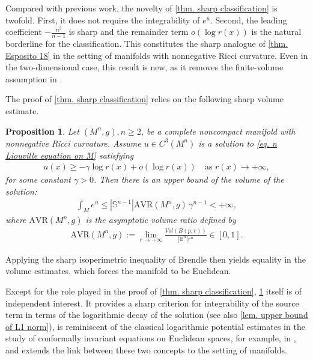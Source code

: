 \documentclass[12pt]{amsart}
\theoremstyle{plain}
\newtheorem{proposition}[theorem]{Proposition}
\theoremstyle{definition}
\theoremstyle{remark}     %
\begin{document}
Compared with previous work, the novelty of \cref{thm. sharp classification} is twofold. First, it does not require the integrability of $e^u$. 
Second,  the leading coefficient $-\frac{n^2}{n-1}$ is sharp  and the remainder term $o(\log r(x))$ is the natural borderline for the classification. This constitutes the sharp analogue of \cref{thm. Esposito 18} in the setting of manifolds with nonnegative Ricci curvature.
Even in the two-dimensional case, this result is new, as it removes the finite-volume assumption in \cite{CL24}.

 The proof of \cref{thm. sharp classification} relies on the following sharp volume estimate.
 \begin{proposition}\label{prop. finite volume}
     Let $(M^n,g), n\geq 2$, be a complete noncompact manifold with nonnegative Ricci curvature. Assume $u\in C^3(M^n)$ is a solution to \cref{eq. n Liouville equation on M} satisfying
    \begin{align}\label{eq. logarithmic decay}
        u(x)\geq
        -\gamma\log r(x)
        +o(\log r(x))\quad 
        \text{as }r(x)\to+\infty,
    \end{align}
    for some constant $\gamma>0$.
    Then there is an upper bound of the volume of the solution:
    \begin{align*}
        \int_M e^u
        \leq |\mathbb{S}^{n-1}|\mathrm{AVR}(M^n,g)\, \gamma^{n-1}<+\infty,
    \end{align*}
    where $\mathrm{AVR}(M^n,g)$ is the asymptotic volume ratio defined by
    \begin{align}\label{def. AVR}
        \mathrm{AVR}(M^n,g):=\lim_{r\to+\infty}
        \frac{Vol(B(p,r))}{|\mathbb{B}^n|r^n}
        \in[0,1].
    \end{align}
 \end{proposition}
  Applying the sharp isoperimetric inequality of Brendle \cite{Bre23} then yields equality in the volume estimates, which forces the manifold to be Euclidean.
 

  Except for the role played in the proof of \cref{thm. sharp classification}, \cref{prop. finite volume} itself  is of independent interest. It provides a sharp criterion for integrability of the source term in terms of the logarithmic decay of the solution (see also \cref{lem. upper bound of L1 norm}),
  is reminiscent of the classical logarithmic potential estimates in the study of conformally invariant equations on Euclidean spaces, for example, in \cite{CL97, CQY00, MQ21, Li24},
  and extends the link between these two concepts to the setting of manifolds.
\end{document}
